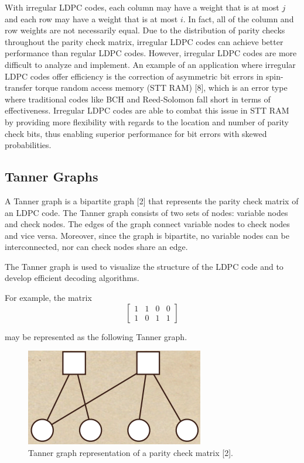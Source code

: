 \documentclass[conference]{IEEEtran}
\begin{document}
With irregular LDPC codes, each column may have a weight that is at most $j$ and each row may have a weight that is at most $i$.
In fact, all of the column and row weights are not necessarily equal.
Due to the distribution of parity checks throughout the parity check matrix, irregular LDPC codes can achieve better performance than regular LDPC codes.
However, irregular LDPC codes are more difficult to analyze and implement.
An example of an application where irregular LDPC codes offer efficiency 
is the correction of asymmetric bit errors in spin-transfer torque random access memory (STT RAM) [8], which is an error type where traditional codes like BCH and Reed-Solomon fall short in terms of effectiveness.
Irregular LDPC codes are able to combat this issue in STT RAM by providing more flexibility with regards to the location and number of parity check bits,
thus enabling superior performance for bit errors with skewed probabilities.

\subsection{Tanner Graphs}
A Tanner graph is a bipartite graph [2] that represents the parity check matrix of
an LDPC code. The Tanner graph consists of two sets of nodes: variable nodes
and check nodes. The edges of the graph connect variable nodes to check nodes
and vice versa.
Moreover, since the graph is bipartite, no variable nodes can be interconnected, nor can check nodes share an edge.

The Tanner graph is used to visualize the structure of the LDPC code and to
develop efficient decoding algorithms.

For example, the matrix
\[
  \begin{bmatrix}
    1 & 1 & 0 & 0 \\
    1 & 0 & 1 & 1
  \end{bmatrix}
\]

may be represented as the following Tanner graph.

\begin{figure}[htbp]
  \centerline{\includegraphics{Images/tanner_graph.png}}
  \caption{Tanner graph representation of a parity check matrix [2].}
  \label{fig}
\end{figure}
\end{document}

